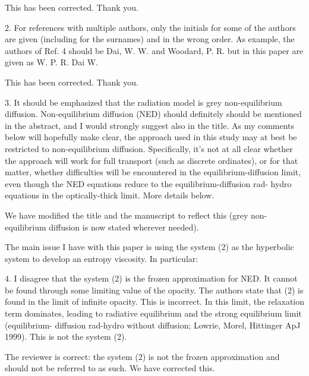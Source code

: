 \documentclass{article}
\begin{document}
This has been corrected. Thank you.
\bigskip


{
\color{blue}
2. For references with multiple authors, only the initials for some of the authors are given (including for the surnames) and in the wrong order. As example, the authors of Ref. 4 should be Dai, W. W. and Woodard, P. R. but in this paper are given as W. P. R. Dai W.}

This has been corrected.  Thank you.
\bigskip


{
\color{blue}
3. It should be emphasized that the radiation model is grey non-equilibrium diffusion. Non-equilibrium diffusion (NED) should definitely should be mentioned in the abstract, and I would strongly suggest also in the title. As my comments below will hopefully make clear, the approach used in this study may at best be restricted to non-equilibrium diffusion. Specifically, it's not at all clear whether the approach will work for full transport (such as discrete ordinates), or for that matter, whether difficulties will be encountered in the equilibrium-diffusion limit, even though the NED equations reduce to the equilibrium-diffusion rad- hydro equations in the optically-thick limit. More details below.
}

We have modified the title and the manuscript to reflect this (grey non-equilibrium diffusion is now stated wherever needed).
\bigskip


{
\color{blue}
The main issue I have with this paper is using the system (2) as the hyperbolic system to develop an entropy viscosity. In particular:
}
\bigskip


{
\color{blue}
4. I disagree that the system (2) is the frozen approximation for NED. It cannot be found through some limiting value of the opacity. The authors state that (2) is found in the limit of infinite opacity. This is incorrect. In this limit, the relaxation term dominates, leading to radiative equilibrium and the strong equilibrium limit (equilibrium- diffusion rad-hydro without diffusion; Lowrie, Morel, Hittinger ApJ 1999). This is not the system (2).
}

The reviewer is correct: the system (2) is not the frozen approximation and should not be referred to as such. We have corrected this. 
\bigskip
\end{document}
